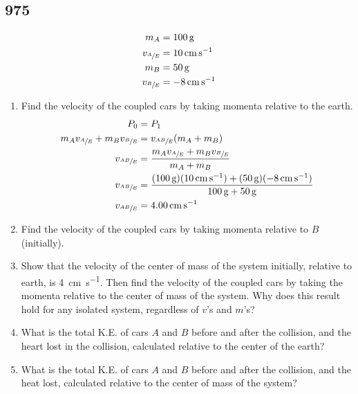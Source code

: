 \documentclass{article}
\begin{document}
\subsection{975}

\begin{align*}
	m_A & = \SI{100}{\gram} \\
	v_{\sfrac{A}{E}} & = \SI{10}{\centi \meter \per \second} \\
	m_B & = \SI{50}{\gram} \\
	v_{\sfrac{B}{E}} & = \SI{-8}{\centi \meter \per \second}
\end{align*}
\begin{enumerate}[label = \textbf{(\alph*)}]
	\item Find the velocity of the coupled cars by taking momenta relative to the earth.
		\begin{align*}
			P_0 & = P_1 \\
			m_Av_{\sfrac{A}{E}} + m_Bv_{\sfrac{B}{E}} & = v_{\sfrac{AB}{E}}(m_A + m_B) \\
			v_{\sfrac{AB}{E}} & = \frac{ m_Av_{\sfrac{A}{E}} + m_Bv_{\sfrac{B}{E}} }{ m_A + m_B } \\
			v_{\sfrac{AB}{E}} & = \frac{ (\SI{100}{\gram})(\SI{10}{\centi \meter \per \second}) + (\SI{50}{\gram})(\SI{-8}{\centi \meter \per \second}) }{ \SI{100}{\gram} + \SI{50}{\gram} } \\
			v_{\sfrac{AB}{E}} & = \SI{4.00}{\centi \meter \per \second}
		\end{align*}
	\item Find the velocity of the coupled cars by taking momenta relative to $ B $ (initially).
	\item Show that the velocity of the center of mass of the system initially, relative to earth, is \SI{+4}{\centi \meter \per \second}. Then find the velocity of the coupled cars by taking the momenta relative to the center of mass of the system. Why does this result hold for any isolated system, regardless of $ v $'s and $ m $'s?
	\item What is the total K.E. of cars $ A $ and $ B $ before and after the collision, and the heart lost in the collision, calculated relative to the center of the earth?
	\item What is the total K.E. of cars $ A $ and $ B $ before and after the collision, and the heat lost, calculated relative to the center of mass of the system?
\end{enumerate}
\end{document}
